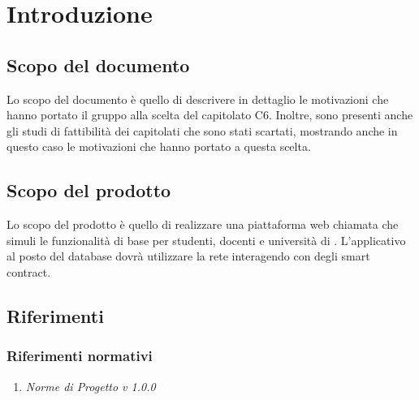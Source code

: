 \documentclass[StudioDiFattibilità.tex]{subfiles}
\begin{document}
\chapter{Introduzione}
\section{Scopo del documento}
Lo scopo del documento è quello di descrivere in dettaglio le motivazioni che hanno portato il gruppo alla scelta del capitolato C6. Inoltre, sono presenti anche gli studi di fattibilità dei capitolati che sono stati scartati, mostrando anche in questo caso le motivazioni che hanno portato a questa scelta.
\section{Scopo del prodotto}
Lo scopo del prodotto è quello di realizzare una piattaforma web chiamata \progetto che simuli le funzionalità di base per studenti, docenti e università di . L'applicativo al posto del database dovrà utilizzare la rete  interagendo con degli smart contract.

\glossExpl

\section{Riferimenti}
\subsection{Riferimenti normativi}
\begin{enumerate}
	\item \textit{Norme di Progetto v 1.0.0}
\end{enumerate}
\end{document}
